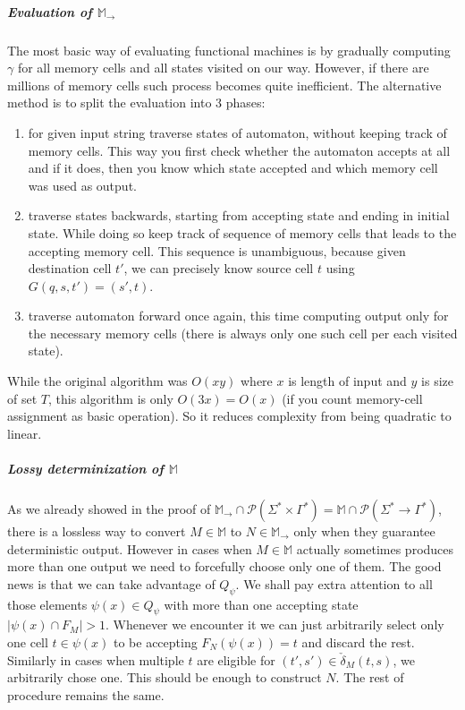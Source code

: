 \documentclass[12pt]{article}
\begin{document}
\subparagraph{Evaluation of $\mathbb{M}_\rightarrow$} The most basic way of evaluating functional machines is by gradually computing $\gamma$ for all memory cells and all states visited on our way. However, if there are millions of memory cells such process becomes quite inefficient. The alternative method is to split the evaluation into 3 phases:
\begin{enumerate}
	\item for given input string traverse states of automaton, without keeping track of memory cells. This way you first check whether the automaton accepts at all and if it does, then you know which state accepted and which memory cell was used as output.
	\item traverse states backwards, starting from accepting state and ending in initial state. While doing so keep track of sequence of memory cells that leads to the accepting memory cell. This sequence is unambiguous, because given destination cell $t'$, we can precisely know source cell $t$ using $G(q,s,t') = (s',t)$.
	\item traverse automaton forward once again, this time computing output only for the necessary memory cells (there is always only one such cell per each visited state). 
\end{enumerate}
While the original algorithm was $O(xy)$ where $x$ is length of input and $y$ is size of set $T$, this algorithm is only $O(3x) = O(x)$ (if you count memory-cell assignment as basic operation). So it reduces complexity from being quadratic to linear.

\subparagraph{Lossy determinization of $\mathbb{M}$} As we already showed in the proof of $\mathbb{M}_\rightarrow \cap \mathcal{P}(\Sigma^* \times \Gamma^*) =  \mathbb{M} \cap \mathcal{P}(\Sigma^* \rightarrow \Gamma^*)$, there is a lossless way to convert $M \in \mathbb{ M}$ to $N \in \mathbb{M}_\rightarrow$ only when they guarantee deterministic output. However in cases when $M \in \mathbb{ M}$ actually sometimes produces more than one output we need to forcefully choose only one of them. The good news is that we can take advantage of $Q_\psi$. We shall pay extra attention to all those elements $\psi(x) \in Q_\psi$ with more than one accepting state $\vert\psi(x) \cap F_M\vert > 1$. Whenever we encounter it we can just arbitrarily select only one cell $t \in \psi(x)$ to be accepting $F_N(\psi(x)) = t$ and discard the rest. Similarly in cases when multiple $t$ are eligible for $(t',s') \in \check{\delta}_M(t,s)$, we arbitrarily chose one. This should be enough to construct $N$. The rest of procedure remains the same. 
\end{document}
